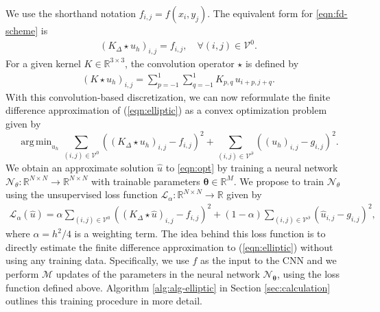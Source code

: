 \documentclass[preprint,12pt]{elsarticle}
\newcommand{\bftheta}{\boldsymbol{\theta}}
\DeclareMathOperator*{\argmin}{arg\,min}
\begin{document}
We use the shorthand notation $f_{i,j} = f(x_i,y_j)$. 
The equivalent form for \eqref{eqn:fd-scheme} is
\begin{align} \label{eqn:fd-conv}
    (K_{\Delta} \star u_h)_{i,j} = f_{i,j}, \quad \forall (i,j)\in\mathcal{V}^0.
\end{align}
%
For a given kernel $K \in \mathbb{R}^{3 \times 3}$, the convolution operator $\star$ is defined by
\begin{align}
    (K \star u_h)_{i,j} = \sum_{p=-1}^1 \sum_{q=-1}^1 K_{p,q} \, u_{i+p,j+q}.
\end{align}
With this convolution-based discretization, we can now reformulate the finite difference approximation of (\ref{eqn:elliptic}) as a convex optimization problem given by
\begin{dmath} \label{eqn:opt}
    \argmin_{u_h} \sum_{(i,j) \in \mathcal{V}^0} \left(\left(K_{\Delta} \star u_h\right)_{i,j} -f_{i,j}\right)^2 + \sum_{(i,j) \in \mathcal{V}^\partial} \left(\left( u_h \right)_{i,j} - g_{i,j}\right)^2.
\end{dmath}
We obtain an approximate solution $\hat{u}$ to \eqref{eqn:opt} by training a neural network $\mathcal{N}_{\theta}: \mathbb{R}^{N \times N} \rightarrow \mathbb{R}^{N \times N}$ with trainable parameters $\bftheta\in\mathbb{R}^M$.  We propose to train $\mathcal{N}_{\theta}$ using the unsupervised loss function $\mathcal{L}_{\alpha}: \mathbb{R}^{N \times N} \rightarrow \mathbb{R}$ given by
\begin{align}
\label{eqn:loss}
    \mathcal{L}_{\alpha}(\hat{u}) = \alpha \sum_{(i,j) \in \mathcal{V}^0} \left(\left(K_{\Delta} \star 
    \hat{u}\right)_{i,j} - f_{i,j}\right)^2 + (1 - \alpha) \sum_{(i,j) \in \mathcal{V}^\partial} \left(\hat{u}_{i,j} - g_{i,j}\right)^2,
\end{align}
where $\alpha = h^2 / 4$ is a weighting term. The idea behind this loss function is to directly estimate the finite difference approximation to (\ref{eqn:elliptic}) without using any training data. Specifically, we use $f$ as the input to the CNN and we perform $\mathcal{M}$ updates of the parameters in the neural network $\mathcal{N}_\bftheta$, using the loss function defined above.   Algorithm \ref{alg:alg-elliptic} in Section \ref{sec:calculation} outlines this training procedure in more detail.
\end{document}

